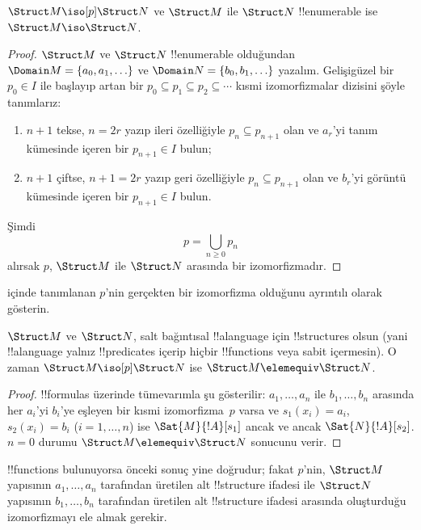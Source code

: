 \begin{thm}
  $\Struct M\iso[p]\Struct N$ ve $\Struct M$ ile $\Struct N$
  !!{enumerable} ise $\Struct M\iso\Struct N$.
\end{thm}

\begin{proof}
  $\Struct M$ ve $\Struct N$ !!{enumerable} olduğundan
  $\Domain M=\{a_0,a_1,\ldots\}$ ve
  $\Domain N=\{b_0,b_1,\ldots\}$ yazalım. Gelişigüzel bir $p_0\in I$
  ile başlayıp artan bir
  $p_0\subseteq p_1\subseteq p_2\subseteq\cdots$ kısmi izomorfizmalar
  dizisini şöyle tanımlarız:
  \begin{enumerate}
  \item $n+1$ tekse, $n=2r$ yazıp ileri özelliğiyle
    $p_n\subseteq p_{n+1}$ olan ve $a_r$'yi tanım kümesinde içeren bir
    $p_{n+1}\in I$ bulun;
  \item $n+1$ çiftse, $n+1=2r$ yazıp geri özelliğiyle
    $p_n\subseteq p_{n+1}$ olan ve $b_r$'yi görüntü kümesinde içeren bir
    $p_{n+1}\in I$ bulun.
  \end{enumerate}
Şimdi
\[
p=\bigcup_{n\geq0}p_n
\]
alırsak $p$, $\Struct M$ ile $\Struct N$ arasında bir izomorfizmadır.
\end{proof}

\begin{prob}
   içinde tanımlanan $p$'nin gerçekten
  bir izomorfizma olduğunu ayrıntılı olarak gösterin.
\end{prob}

\begin{thm}
  $\Struct M$ ve $\Struct N$, salt bağıntısal !!a{language} için
  !!{structure}s olsun (yani !!a{language} yalnız !!{predicate}s
  içerip hiçbir !!{function}s veya sabit içermesin). O zaman
  $\Struct M\iso[p]\Struct N$ ise
  $\Struct M\elemequiv\Struct N$.
\end{thm}

\begin{proof}
  !!{formula}s üzerinde tümevarımla şu gösterilir: $a_1,\dots,a_n$ ile
  $b_1,\dots,b_n$ arasında her $a_i$'yi $b_i$'ye eşleyen bir kısmi
  izomorfizma~$p$ varsa ve $s_1(x_i)=a_i$, $s_2(x_i)=b_i$
  ($i=1,\dots,n$) ise $\Sat{M}{!A}[s_1]$ ancak ve ancak
  $\Sat{N}{!A}[s_2]$. $n=0$ durumu
  $\Struct M\elemequiv\Struct N$ sonucunu verir.
\end{proof}

\begin{rem}
!!{function}s bulunuyorsa önceki sonuç yine doğrudur; fakat $p$'nin,
$\Struct M$ yapısının $a_1,\dots,a_n$ tarafından üretilen alt
!!{structure} ifadesi ile $\Struct N$ yapısının $b_1,\dots,b_n$
tarafından üretilen alt !!{structure} ifadesi arasında oluşturduğu
izomorfizmayı ele almak gerekir.
\end{rem}

